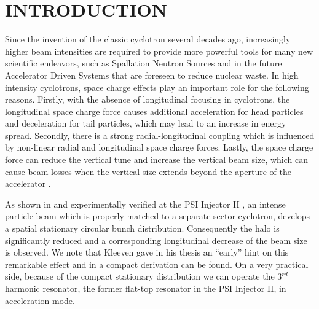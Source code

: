 \documentclass[aps,prstab,onecolumn,superscriptaddress,showpacs]{revtex4}
\begin{document}
\section{INTRODUCTION \label{intro}}
Since the invention of the classic cyclotron several decades ago, increasingly higher beam intensities are required  
to provide more powerful tools for many new scientific endeavors, such as Spallation Neutron Sources
and in the future Accelerator Driven Systems that are foreseen to reduce nuclear waste.
In high intensity cyclotrons, space charge effects play an important role for the following reasons.
Firstly, with the absence of longitudinal focusing in cyclotrons, the longitudinal space charge force causes additional acceleration for 
head particles and deceleration for tail particles, which may lead to an increase in energy spread. Secondly, there is a strong 
radial-longitudinal coupling which is influenced by non-linear radial and longitudinal space charge forces. 
Lastly, the space charge force can reduce the vertical tune and increase the vertical beam size, which can cause beam losses when the vertical size 
extends beyond the aperture of the accelerator \cite{Baartman:1}.

As shown in \cite{Adam:0,Adam:1,Adam:2, Bert:2001,Ada:1,Poz:1} and experimentally verified at the PSI Injector II \cite{HumbPC}, an intense particle beam which is properly matched to a separate sector cyclotron, 
develops a spatial stationary circular bunch distribution. Consequently the halo is significantly reduced and a corresponding longitudinal decrease of the beam size is observed. 
We note that Kleeven gave in his thesis \cite{kleeven:1} an ``early'' hint on this remarkable effect and in \cite{Bert:2001} a compact derivation can be found.
On a very practical side, because of the compact stationary distribution 
we can operate the 3$^{rd}$ harmonic resonator, the former flat-top resonator in the PSI Injector II, in acceleration mode.
\end{document}
